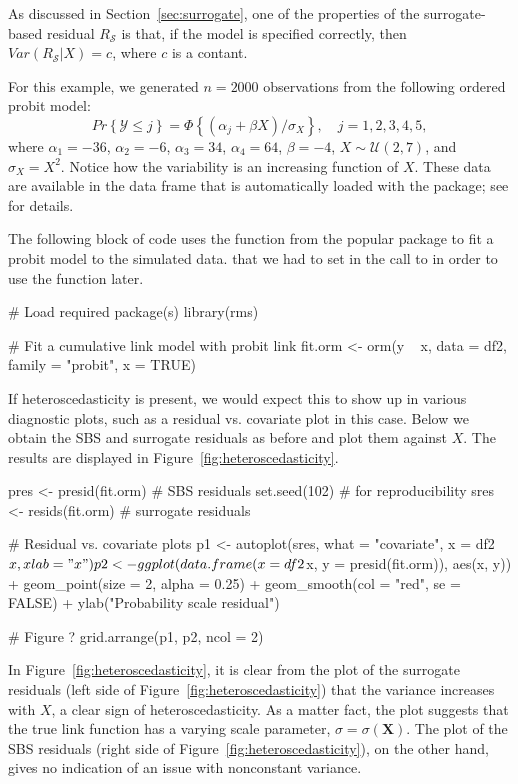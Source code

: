 As discussed in Section~\ref{sec:surrogate}, one of the properties of the surrogate-based residual $R_\mathcal{S}$ is that, if the model is specified correctly, then $Var\left(R_\mathcal{S} | X\right) = c$, where $c$ is a contant.

For this example, we generated $n = 2000$ observations from the following ordered probit model:
\begin{equation*}
  Pr\left\{\mathcal{Y} \le j\right\} = \Phi\left\{\left(\alpha_j + \beta X\right) / \sigma_X\right\}, \quad j = 1, 2, 3, 4, 5,
\end{equation*}
where $\alpha_1 = -36$, $\alpha_2 = -6$, $\alpha_3 = 34$, $\alpha_4 = 64$, $\beta = -4$, $X \sim \mathcal{U}\left(2, 7\right)$, and $\sigma_X = X ^ 2$.
Notice how the variability is an increasing function of $X$. These data are available in the  data frame that is automatically loaded with the  package; see  for details.

The following block of code uses the  function from the popular  package to fit a probit model to the simulated data.  that we had to set  in the call to  in order to use the  function later.
\begin{example}
# Load required package(s)
library(rms)

# Fit a cumulative link model with probit link
fit.orm <- orm(y ~ x, data = df2, family = "probit", x = TRUE)
\end{example}

If heteroscedasticity is present, we would expect this to show up in various diagnostic plots, such as a residual vs. covariate plot in this case. Below we obtain the SBS and surrogate residuals as before and plot them against $X$. The results are displayed in Figure~\ref{fig:heteroscedasticity}.
\begin{example}
pres <- presid(fit.orm)  # SBS residuals
set.seed(102)  # for reproducibility
sres <- resids(fit.orm)  # surrogate residuals

# Residual vs. covariate plots
p1 <- autoplot(sres, what = "covariate", x = df2$x, xlab = "x")
p2 <- ggplot(data.frame(x = df2$x, y = presid(fit.orm)), aes(x, y)) +
  geom_point(size = 2, alpha = 0.25) +
  geom_smooth(col = "red", se = FALSE) +
  ylab("Probability scale residual")
  
# Figure ?
grid.arrange(p1, p2, ncol = 2)
\end{example}

In Figure~\ref{fig:heteroscedasticity}, it is clear from the plot of the surrogate residuals (left side of Figure~\ref{fig:heteroscedasticity}) that the variance increases with $X$, a clear sign of heteroscedasticity. As a matter fact, the plot suggests that the true link function has a varying scale parameter, $\sigma = \sigma\left(\boldsymbol{X}\right)$. The plot of the SBS residuals (right side of Figure~\ref{fig:heteroscedasticity}), on the other hand, gives no indication of an issue with nonconstant variance.

